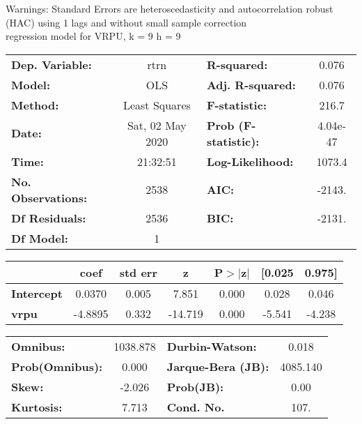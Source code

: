 Warnings: \newline
 [1] Standard Errors are heteroscedasticity and autocorrelation robust (HAC) using 1 lags and without small sample correction\\ 

regression model for VRPU, k = 9 h = 9\begin{center}
\begin{tabular}{lclc}
\toprule
\textbf{Dep. Variable:}    &       rtrn       & \textbf{  R-squared:         } &     0.076   \\
\textbf{Model:}            &       OLS        & \textbf{  Adj. R-squared:    } &     0.076   \\
\textbf{Method:}           &  Least Squares   & \textbf{  F-statistic:       } &     216.7   \\
\textbf{Date:}             & Sat, 02 May 2020 & \textbf{  Prob (F-statistic):} &  4.04e-47   \\
\textbf{Time:}             &     21:32:51     & \textbf{  Log-Likelihood:    } &    1073.4   \\
\textbf{No. Observations:} &        2538      & \textbf{  AIC:               } &    -2143.   \\
\textbf{Df Residuals:}     &        2536      & \textbf{  BIC:               } &    -2131.   \\
\textbf{Df Model:}         &           1      & \textbf{                     } &             \\
\bottomrule
\end{tabular}
\begin{tabular}{lcccccc}
                   & \textbf{coef} & \textbf{std err} & \textbf{z} & \textbf{P$> |$z$|$} & \textbf{[0.025} & \textbf{0.975]}  \\
\midrule
\textbf{Intercept} &       0.0370  &        0.005     &     7.851  &         0.000        &        0.028    &        0.046     \\
\textbf{vrpu}      &      -4.8895  &        0.332     &   -14.719  &         0.000        &       -5.541    &       -4.238     \\
\bottomrule
\end{tabular}
\begin{tabular}{lclc}
\textbf{Omnibus:}       & 1038.878 & \textbf{  Durbin-Watson:     } &    0.018  \\
\textbf{Prob(Omnibus):} &   0.000  & \textbf{  Jarque-Bera (JB):  } & 4085.140  \\
\textbf{Skew:}          &  -2.026  & \textbf{  Prob(JB):          } &     0.00  \\
\textbf{Kurtosis:}      &   7.713  & \textbf{  Cond. No.          } &     107.  \\
\bottomrule
\end{tabular}
\end{center}

